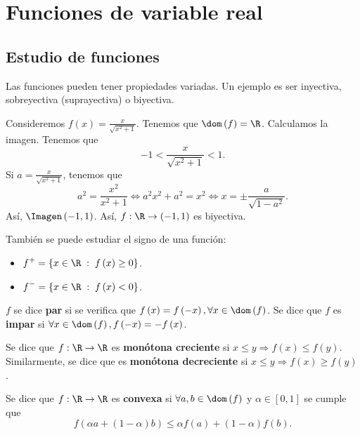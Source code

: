 \section{Funciones de variable real}
\subsection{Estudio de funciones}
Las funciones pueden tener propiedades variadas. Un ejemplo es ser inyectiva, sobreyectiva (suprayectiva) o biyectiva. 
\begin{eg}
\normalfont Consideremos $\displaystyle f\left(x\right) = \frac{x}{\sqrt{x^{2}+1}} $. Tenemos que $\displaystyle \dom\left(f\right) = \R$. Calculamos la imagen. Tenemos que
\[ -1 < \frac{x}{\sqrt{x^{2}+1}} < 1 .\]
Si $\displaystyle a = \frac{x}{\sqrt{x^{2}+1}} $, tenemos que
\[a^{2} = \frac{x^{2}}{x^{2}+1} \iff a^{2}x^{2} + a^{2} = x^{2} \iff x = \pm \frac{a}{\sqrt{1 -a^{2}}} .\]
Así, $\displaystyle \Imagen\left(-1, 1\right) $. Así, $\displaystyle f : \R \to \left(-1, 1\right) $ es biyectiva.
\end{eg}
También se puede estudiar el signo de una función:
\begin{itemize}
	\item $\displaystyle f^{+} = \left\{ x \in \R \; : \; f\left(x\right) \geq 0\right\}  $.
	\item $\displaystyle f^{-} = \left\{ x \in \R \; : \; f\left(x\right) < 0\right\}  $.
\end{itemize}
\begin{fdefinition}[Paridad]
\normalfont $\displaystyle f $ se dice \textbf{par} si se verifica que $\displaystyle f\left(x\right) = f\left(-x\right), \forall x \in \dom\left(f\right) $. Se dice que $\displaystyle f $ es \textbf{impar} si $\displaystyle \forall x \in \dom\left(f\right), f\left(-x\right) = -f\left(x\right) $.
\end{fdefinition}
\begin{fdefinition}[Monotonía]
\normalfont Se dice que $\displaystyle f : \R \to \R $ es \textbf{monótona creciente} si $\displaystyle x \leq y \Rightarrow f\left(x\right) \leq f\left(y\right) $. Similarmente, se dice que es \textbf{monótona decreciente} si $\displaystyle x \leq y \Rightarrow f\left(x\right) \geq f\left(y\right) $.
\end{fdefinition}
\begin{fdefinition}[Convexidad]
	\normalfont Se dice que $\displaystyle f : \R \to \R $ es \textbf{convexa} si $\displaystyle \forall a,b \in \dom\left(f\right)$ y $\displaystyle \alpha \in [0,1] $ se cumple que 
	\[f\left(\alpha a + \left(1-\alpha \right)b\right) \leq \alpha f\left(a\right) + \left(1-\alpha \right)f\left(b\right) .\]
\end{fdefinition}
